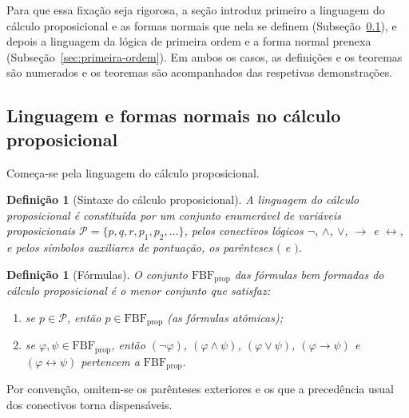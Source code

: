 \documentclass[12pt,a4paper,oneside]{report}
\theoremstyle{tituloplain}
\theoremstyle{titulodef}
\newtheorem{definicao}[teorema]{Definição}
\begin{document}
Para que essa fixação seja rigorosa, a seção introduz primeiro a linguagem do cálculo proposicional e as formas normais que nela se definem (Subseção~\ref{sec:proposicional}), e depois a linguagem da lógica de primeira ordem e a forma normal prenexa (Subseção~\ref{sec:primeira-ordem}). Em ambos os casos, as definições e os teoremas são numerados e os teoremas são acompanhados das respetivas demonstrações.

\subsection{Linguagem e formas normais no cálculo proposicional}\label{sec:proposicional}

Começa-se pela linguagem do cálculo proposicional.

\begin{definicao}[Sintaxe do cálculo proposicional]\label{def:sintaxe-prop}
A linguagem do cálculo proposicional é constituída por um conjunto enumerável de \emph{variáveis proposicionais} $\mathcal{P}=\{p,q,r,p_1,p_2,\dots\}$, pelos \emph{conectivos lógicos} $\neg$, $\wedge$, $\vee$, $\rightarrow$ e $\leftrightarrow$, e pelos símbolos auxiliares de pontuação, os parênteses $($ e $)$.
\end{definicao}

\begin{definicao}[Fórmulas]\label{def:formulas-prop}
O conjunto $\mathrm{FBF}_{\mathrm{prop}}$ das \emph{fórmulas bem formadas} do cálculo proposicional é o menor conjunto que satisfaz:
\begin{enumerate}
  \item se $p\in\mathcal{P}$, então $p\in\mathrm{FBF}_{\mathrm{prop}}$ (as \emph{fórmulas atômicas});
  \item se $\varphi,\psi\in\mathrm{FBF}_{\mathrm{prop}}$, então $(\neg\varphi)$, $(\varphi\wedge\psi)$, $(\varphi\vee\psi)$, $(\varphi\rightarrow\psi)$ e $(\varphi\leftrightarrow\psi)$ pertencem a $\mathrm{FBF}_{\mathrm{prop}}$.
\end{enumerate}
\end{definicao}

Por convenção, omitem-se os parênteses exteriores e os que a precedência usual dos conectivos torna dispensáveis.
\end{document}
